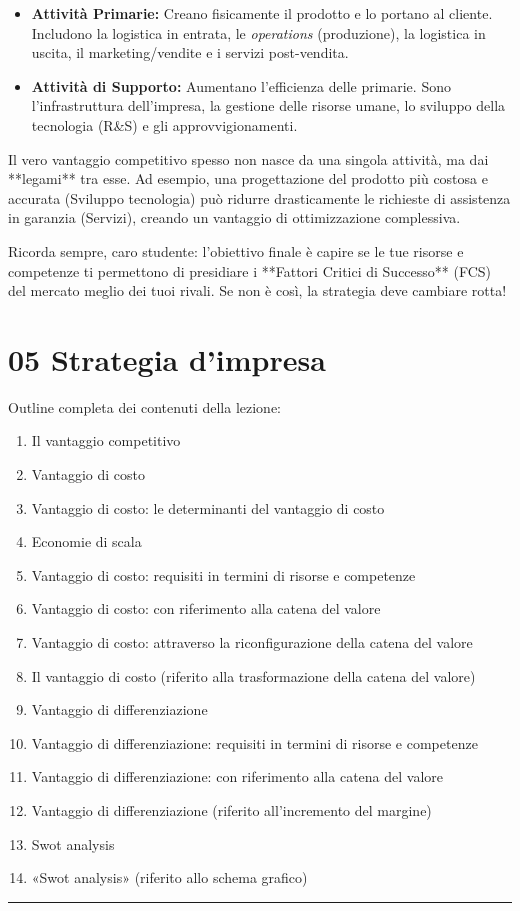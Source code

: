 \documentclass[a4paper,10pt]{article}
\begin{document}
\begin{itemize}
    \item \textbf{Attività Primarie:} Creano fisicamente il prodotto e lo portano al cliente. Includono la logistica in entrata, le \textit{operations} (produzione), la logistica in uscita, il marketing/vendite e i servizi post-vendita.
    \item \textbf{Attività di Supporto:} Aumentano l'efficienza delle primarie. Sono l'infrastruttura dell'impresa, la gestione delle risorse umane, lo sviluppo della tecnologia (R\&S) e gli approvvigionamenti.
\end{itemize}

Il vero vantaggio competitivo spesso non nasce da una singola attività, ma dai **legami** tra esse. Ad esempio, una progettazione del prodotto più costosa e accurata (Sviluppo tecnologia) può ridurre drasticamente le richieste di assistenza in garanzia (Servizi), creando un vantaggio di ottimizzazione complessiva.

Ricorda sempre, caro studente: l'obiettivo finale è capire se le tue risorse e competenze ti permettono di presidiare i **Fattori Critici di Successo** (FCS) del mercato meglio dei tuoi rivali. Se non è così, la strategia deve cambiare rotta!
\section*{05 Strategia d'impresa}

Outline completa dei contenuti della lezione:
{\small
\begin{enumerate}
\item Il vantaggio competitivo
\item Vantaggio di costo
\item Vantaggio di costo: le determinanti del vantaggio di costo
\item Economie di scala
\item Vantaggio di costo: requisiti in termini di risorse e competenze
\item Vantaggio di costo: con riferimento alla catena del valore
\item Vantaggio di costo: attraverso la riconfigurazione della catena del valore
\item Il vantaggio di costo (riferito alla trasformazione della catena del valore)
\item Vantaggio di differenziazione
\item Vantaggio di differenziazione: requisiti in termini di risorse e competenze
\item Vantaggio di differenziazione: con riferimento alla catena del valore
\item Vantaggio di differenziazione (riferito all'incremento del margine)
\item Swot analysis
\item «Swot analysis» (riferito allo schema grafico)
\end{enumerate}
}
\hrule
\vspace{0.5cm}
\end{document}
